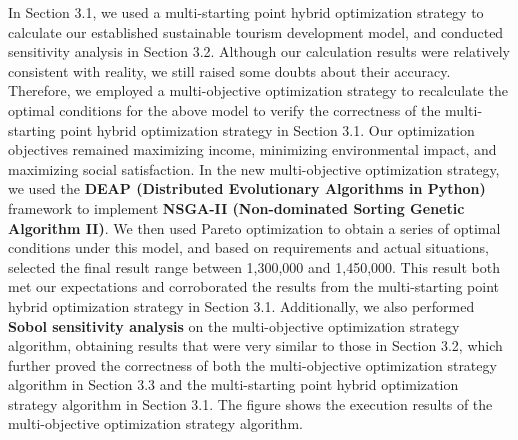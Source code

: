 \documentclass[12pt]{article}  %
\begin{document}
In Section 3.1, we used a multi-starting point hybrid optimization strategy to calculate our established sustainable tourism development model, and conducted sensitivity analysis in Section 3.2. Although our calculation results were relatively consistent with reality, we still raised some doubts about their accuracy. Therefore, we employed a multi-objective optimization strategy to recalculate the optimal conditions for the above model to verify the correctness of the multi-starting point hybrid optimization strategy in Section 3.1. Our optimization objectives remained maximizing income, minimizing environmental impact, and maximizing social satisfaction. In the new multi-objective optimization strategy, we used the \textbf{DEAP (Distributed Evolutionary Algorithms in Python)} framework to implement \textbf{NSGA-II (Non-dominated Sorting Genetic Algorithm II)}. We then used Pareto optimization to obtain a series of optimal conditions under this model, and based on requirements and actual situations, selected the final result range between 1,300,000 and 1,450,000. This result both met our expectations and corroborated the results from the multi-starting point hybrid optimization strategy in Section 3.1. Additionally, we also performed \textbf{Sobol sensitivity analysis} on the multi-objective optimization strategy algorithm, obtaining results that were very similar to those in Section 3.2, which further proved the correctness of both the multi-objective optimization strategy algorithm in Section 3.3 and the multi-starting point hybrid optimization strategy algorithm in Section 3.1. The figure shows the execution results of the multi-objective optimization strategy algorithm.
\end{document}
